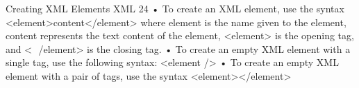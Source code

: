 Creating XML Elements
XML 24
• To create an XML element, use the syntax
<element>content</element>
where element is the name given to the element, content represents the text
content of the element, <element> is the opening tag, and <
­ /element> is the
closing tag.
• To create an empty XML element with a single tag, use the following syntax:
<element />
• To create an empty XML element with a pair of tags, use the syntax
<element></element>



